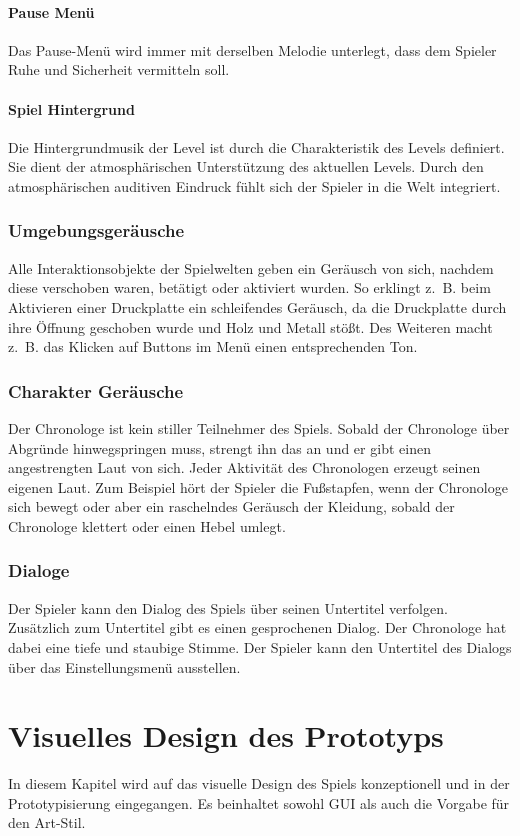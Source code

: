 \subsubsection{Pause Menü}
Das Pause-Menü wird immer mit derselben Melodie unterlegt, dass dem Spieler Ruhe und Sicherheit vermitteln soll. 

\subsubsection{Spiel Hintergrund}
Die Hintergrundmusik der Level ist durch die Charakteristik des Levels definiert. Sie dient der atmosphärischen Unterstützung des aktuellen Levels. Durch den atmosphärischen auditiven Eindruck fühlt sich der Spieler in die Welt integriert.

\subsection{Umgebungsgeräusche}
Alle Interaktionsobjekte der Spielwelten geben ein Geräusch von sich, nachdem diese verschoben waren, betätigt oder aktiviert wurden. So erklingt z. B. beim Aktivieren einer Druckplatte ein schleifendes Geräusch, da die Druckplatte durch ihre Öffnung geschoben wurde und Holz und Metall stößt. Des Weiteren macht z. B. das Klicken auf Buttons im Menü einen entsprechenden Ton.

\subsection{Charakter Geräusche}
Der Chronologe ist kein stiller Teilnehmer des Spiels. Sobald der Chronologe über Abgründe hinwegspringen muss, strengt ihn das an und er gibt einen angestrengten Laut von sich. Jeder Aktivität des Chronologen erzeugt seinen eigenen Laut. Zum Beispiel hört der Spieler die Fußstapfen, wenn der Chronologe sich bewegt oder aber ein raschelndes Geräusch der Kleidung, sobald der Chronologe klettert oder einen Hebel umlegt.

\subsection{Dialoge}
Der Spieler kann den Dialog des Spiels über seinen Untertitel verfolgen. Zusätzlich zum Untertitel gibt es einen gesprochenen Dialog. Der Chronologe hat dabei eine tiefe und staubige Stimme. Der Spieler kann den Untertitel des Dialogs über das Einstellungsmenü ausstellen. 

\chapter{Visuelles Design des Prototyps}\label{sec:design}
In diesem Kapitel wird auf das visuelle Design des Spiels konzeptionell und in der Prototypisierung eingegangen. Es beinhaltet sowohl \ac{GUI} als auch die Vorgabe für den Art-Stil.

